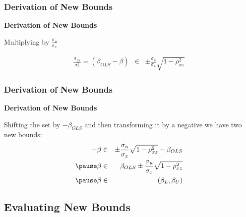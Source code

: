 \documentclass{beamer}
\begin{document}
\begin{frame}
\frametitle{Derivation of New Bounds}
\textbf{Derivation of New Bounds } \\ \bigskip \pause

Multiplying by $\frac{\sigma_u}{\sigma_x}$ \pause

\begin{eqnarray}
\frac{\sigma_{xu}}{\sigma_x^2}=(\beta_{OLS}-\beta)&\in& \pm \frac{\sigma_u}{\sigma_x} \sqrt{1-\rho_{xz}^2} \nonumber 
\end{eqnarray}

\end{frame}

\begin{frame}
\frametitle{Derivation of New Bounds}
\textbf{Derivation of New Bounds } \\ \bigskip \pause

Shifting the set by $-\beta_{OLS}$ and then transforming it by a negative we have two new bounds:  \pause
\begin{eqnarray*}
-\beta&\in& \pm \frac{\sigma_u}{\sigma_x} \sqrt{1-\rho_{xz}^2}-\beta_{OLS} \nonumber \\ \pause
\beta&\in&\beta_{OLS}\pm \frac{\sigma_u}{\sigma_x}\sqrt{1-\rho_{xz}^2} \\ \pause
\beta&\in&(\beta_{L},\beta_{U}) \label{eqn:bounds}
\end{eqnarray*}

\end{frame}

\subsection{Evaluating New Bounds}
\end{document}
